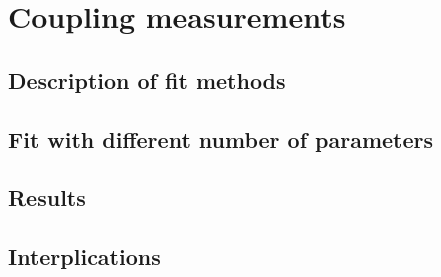 \section{Coupling measurements}
\label{sec:coupling}

\subsection{Description of fit methods}
\subsection{Fit with different number of parameters}
\subsection{Results}
\subsection{Interplications}
